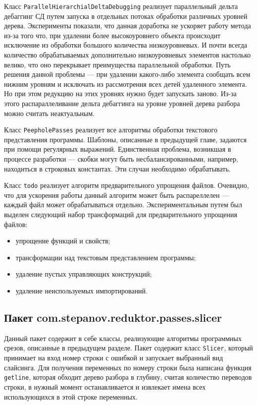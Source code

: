 Класс \texttt{ParallelHierarchialDeltaDebugging} реализует параллельный дельта дебаггинг СД путем запуска в отдельных потоках обработки различных уровней дерева. Эксперименты показали, что данная доработка не ускоряет работу метода из-за того что, при удалении более высокоуровнего объекта происходит исключение из обработки большого количества низкоуровневых. И почти всегда количество обрабатываемых дополнительно низкоуровневых элементов настолько велико, что оно перекрывает преимущества параллельной обработки. Путь решения данной проблемы --- при удалении какого-либо элемента сообщать всем нижним уровням и исключать из рассмотрения всех детей удаленного элемента. Но при этом редукцию на этих уровнях нужно будет запускать заново. Из-за этого распараллеливание дельта дебаггинга на уровне уровней дерева разбора можно считать неактуальным. 

Класс \texttt{PeepholePasses} реализует все алгоритмы обработки текстового представления программы. Шаблоны, описанные в предыдущей главе, задаются при помощи регулярных выражений. Единственная проблема, возникшая в процессе разработки --- скобки могут быть несбалансированными, например, находиться в строковых константах. Эти случаи необходимо обрабатывать.

Класс \texttt{todo} реализует алгоритм предварительного упрощения файлов. Очевидно, что для ускорения работы данный алгоритм может быть распареллелен --- каждый файл может обрабатываться отдельно. Экспериментальным путем был выделен следующий набор трансформаций для предварительного упрощения файлов:
\begin{itemize}
	\item упрощение функций и свойств;
	\item трансформации над текстовым представлением программы;
	\item удаление пустых управляющих конструкций;
	\item удаление неиспользуемых импортирований.
\end{itemize}


\subsection{Пакет com.stepanov.reduktor.passes.slicer}
Данный пакет содержит в себе классы, реализующие алгоритмы программных срезов, описанные в предыдущем разделе. Пакет содержит класс \texttt{Slicer}, который принимает на вход номер строки с ошибкой и запускает выбранный вид слайсинга. Для получения переменных по номеру строки была написана функция \texttt{getline}, которая обходит дерево разбора в глубину, считая количество переводов строки, в нужный момент останавливается и извлекает имена всех использующихся в этой строке переменных. 

